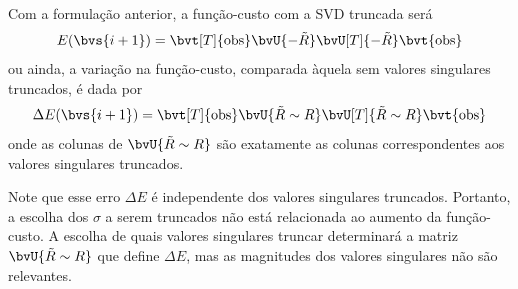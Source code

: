 
Com a formulação anterior, a função-custo com a SVD truncada será
\begin{equation}
	E(\bvs{i+1}) = \bvt[T]{\obs} \bvU{-\tilde{R}} \bvU[T]{-\tilde{R}} \bvt{\obs}
\end{equation}
ou ainda, a variação na função-custo, comparada àquela sem valores singulares truncados, é dada por
\begin{equation}
	\Delta E(\bvs{i+1}) = \bvt[T]{\obs}  \bvU{\tilde{R}\sim R} \bvU[T]{\tilde{R}\sim R} \bvt{\obs}
\end{equation}
onde as colunas de $\bvU{\tilde{R} \sim R}$ são exatamente as colunas correspondentes aos valores singulares truncados.

Note que esse erro $\Delta E$ é independente dos valores singulares truncados. Portanto, a escolha dos $\sigma$ a serem truncados não está relacionada ao aumento da função-custo. A escolha de quais valores singulares truncar determinará a matriz $\bvU{\tilde{R}\sim R}$ que define $\Delta E$, mas as magnitudes dos valores singulares não são relevantes.


